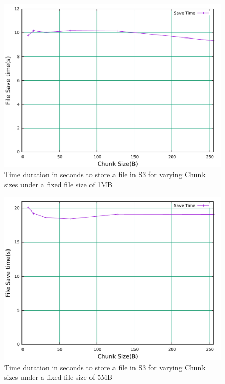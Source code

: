 \begin{figure}[h]
\centering
\includegraphics[width=\linewidth]{figures/RAIDStoreTimeChuckSize1Mb.pdf}
\caption{Time duration in seconds to store a file in S3 for varying Chunk sizes under a fixed file size of 1MB}
\label{fig:S3R6StrCHK1MB}
\end{figure}

\begin{figure}[h]
\centering
\includegraphics[width=\linewidth]{figures/RAIDStoreTimeChuckSize5Mb.pdf}
\caption{Time duration in seconds to store a file in S3 for varying Chunk sizes under a fixed file size of 5MB}
\label{fig:S3R6StrCHK5MB}
\end{figure}

